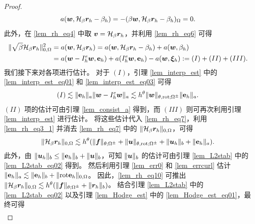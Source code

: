\begin{proof}
\begin{equation}
\label{lem_rh_eq6}
a(\boldsymbol{w},\mathcal{H}_{\beta} \boldsymbol{r}_h -\beta_h) = - (\beta \boldsymbol{w}, \mathcal{H}_{\beta} \boldsymbol{r}_h -\beta_h)_{\Omega} = 0.
\end{equation}
此外，在 \eqref{lem_rh_eq4} 中取 $\boldsymbol{v} =\mathcal{H}_{\beta} \boldsymbol{r}_h$，并利用 \eqref{lem_rh_eq6} 可得
\begin{equation}
\begin{split}
\label{lem_rh_eq7}
\| \sqrt{\beta} \mathcal{H}_{\beta} \boldsymbol{r}_h \|^2_{0,\Omega} & = a(\boldsymbol{w}, \mathcal{H}_{\beta} \boldsymbol{r}_h) = a(\boldsymbol{w}, \mathcal{H}_{\beta} \boldsymbol{r}_h - \beta_h) + a(\boldsymbol{w}, \beta_h) \\
& = a(\boldsymbol{w} - I^e_h \boldsymbol{w}, \mathbf{e}_h ) + a(I^e_h \boldsymbol{w}, \mathbf{e}_h ) - a(\boldsymbol{w}, \boldsymbol{\xi}_h) := (I) + (II) + (III).
\end{split}
\end{equation}
我们接下来对各项进行估计。
对于 $(I)$，引理 \ref{lem_interp_est} 中的 \eqref{lem_interp_est_eq01} 和 \eqref{lem_interp_est_eq03} 可得
\begin{equation}
\label{lem_rh_eq8}
(I) \lesssim \| \mathbf{e}_h \|_{a}  \| \boldsymbol{w} - I^e_h \boldsymbol{w} \|_{a} \lesssim h^{\theta} \|
\boldsymbol{w} \|_{\theta,\mathrm{rot};\Omega^{\pm}}  \| \mathbf{e}_h \|_{a}.
\end{equation}
$(II)$ 项的估计可由引理 \ref{lem_consist_a} 得到，而 $(III)$ 则可再次利用引理 \ref{lem_interp_est} 进行估计。
将这些估计代入 \eqref{lem_rh_eq7}，利用 \eqref{lem_rh_eq3_1} 并消去 \eqref{lem_rh_eq7} 中的 $\|\mathcal{H}_{\beta}\boldsymbol{r}_h\|_{0,\Omega}$，可得
\begin{equation}
\begin{split}
\label{lem_rh_eq10}
\|  \mathcal{H}_{\beta} \boldsymbol{r}_h \|_{0,\Omega}
\lesssim h^{\theta} ( \| \boldsymbol{f} \|_{\theta;\Omega^{\pm}}
+ \| \boldsymbol{u} \|_{\theta,\mathrm{rot};\Omega^{\pm}}
+  \| \boldsymbol{u}_h \|_{b}  + \| \mathbf{e}_h \|_{a}  ).
\end{split}
\end{equation}
此外，由 $\| \boldsymbol{u}_h \|_b \le \| \mathbf{e}_h \|_b + \| \boldsymbol{u} \|_b$，可知 $\| \boldsymbol{u} \|_b$ 的估计可由引理 \ref{lem_L2stab} 中的 \eqref{lem_L2stab_eq02} 得到。
然后利用引理 \ref{lem_err0} 和 \ref{lem_errcurl} 估计 $\| \mathbf{e}_h\|_a \lesssim \| \mathbf{e}_h \|_{b} + \| \mathrm{rot} \mathbf{e}_h \|_{0,\Omega}$。
因此，\eqref{lem_rh_eq10} 可推出 $\| \mathcal{H}_{\beta} \boldsymbol{r}_h \|_{0,\Omega}  \lesssim h^{\theta} ( \| \boldsymbol{f} \|_{\theta;\Omega^{\pm}} + \| \boldsymbol{r}_h \|_b )$。
结合引理 \ref{lem_L2stab} 中的 \eqref{lem_L2stab_eq02} 以及引理
\ref{lem_Hodge_est} 中的 \eqref{lem_Hodge_est_eq01}，最终可得
\begin{equation}
\begin{split}

\end{split}
\end{equation}
\end{proof}
